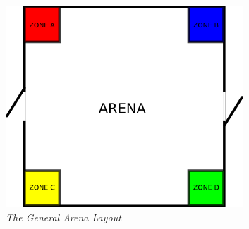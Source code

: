 \begin {figure}[h]
\begin {center}
\includegraphics[keepaspectratio, scale =1]{../arena/arenagame5.png}
\caption{\small{\emph{The General Arena Layout}}}
\label {fig:arena}
\end {center}
\end {figure}

